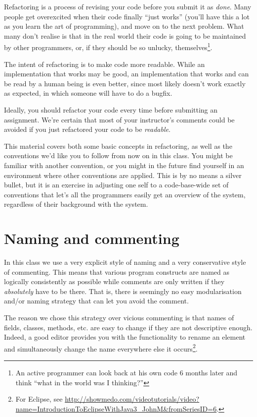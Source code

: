 Refactoring is a process of revising your code before you submit it as
\emph{done}. Many people get overexcited when their code finally ``just works''
(you'll have this a lot as you learn the art of programming), and move on to
the next problem. What many don't realise is that in the real world their code
is going to be maintained by other programmers, or, if they should be so
unlucky, themselves\footnote{An active programmer can look back at his own code
6 months later and think ``what in the world was I thinking?''}.

The intent of refactoring is to make code more readable. While an
implementation that works may be good, an implementation that works and can be
read by a human being is even better, since most likely doesn't work exactly as
expected, in which someone will have to do a bugfix.

Ideally, you should refactor your code every time before submitting an
assignment. We're certain that most of your instructor's comments could be
avoided if you just refactored your code to be \emph{readable}.

This material covers both some basic concepts in refactoring, as well as the
conventions we'd like you to follow from now on in this class. You might be
familiar with another convention, or you might in the future find yourself in
an environment where other conventions are applied. This is by no means a
silver bullet, but it is an exercise in adjusting one self to a code-base-wide
set of conventions that let's all the programmers easily get an overview of the
system, regardless of their background with the system.

\section{Naming and commenting}

In this class we use a very explicit style of naming and a very conservative
style of commenting. This means that various program constructs are named as
logically consistently as possible while comments are only written if they
\emph{absolutely} have to be there. That is, there is seemingly no easy
modularisation and/or naming strategy that can let you avoid the comment.

The reason we chose this strategy over vicious commenting is that names of
fields, classes, methods, etc. are easy to change if they are not descriptive
enough.  Indeed, a good editor provides you with the functionality to rename an
element and simultaneously change the name everywhere else it
occurs\footnote{For Eclipse, see
\url{http://showmedo.com/videotutorials/video?name=IntroductionToEclipseWithJava3_JohnM&fromSeriesID=6}.}. 

